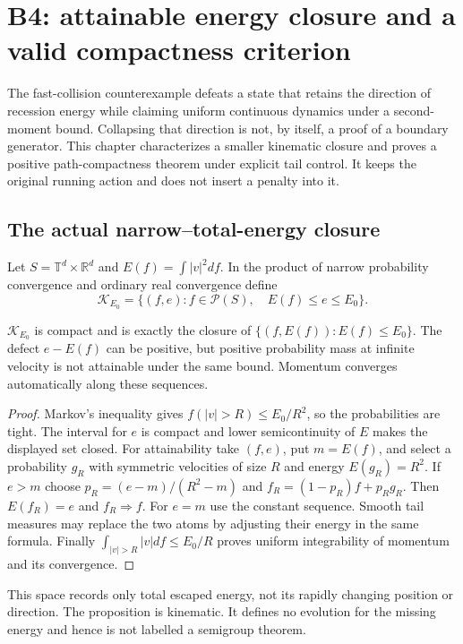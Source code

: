 \section{B4: attainable energy closure and a valid compactness criterion}
\label{sec:r33-b4}

The fast-collision counterexample defeats a state that retains the direction of recession energy while claiming uniform continuous dynamics under a second-moment bound. Collapsing that direction is not, by itself, a proof of a boundary generator. This chapter characterizes a smaller kinematic closure and proves a positive path-compactness theorem under explicit tail control. It keeps the original running action and does not insert a penalty into it.

\subsection{The actual narrow--total-energy closure}
Let $S=\mathbb T^d\times\mathbb R^d$ and $E(f)=\int|v|^2df$. In the product of narrow probability convergence and ordinary real convergence define
\[
 \mathcal K_{E_0}=\{(f,e): f\in\mathcal P(S),\quad E(f)\le e\le E_0\}.
\]

\begin{proposition}
\label{prop:r33-b4-closure}
$\mathcal K_{E_0}$ is compact and is exactly the closure of
$\{(f,E(f)):E(f)\le E_0\}$. The defect $e-E(f)$ can be positive, but positive probability mass at infinite velocity is not attainable under the same bound. Momentum converges automatically along these sequences.
\end{proposition}

\begin{proof}
Markov's inequality gives $f(|v|>R)\le E_0/R^2$, so the probabilities are tight. The interval for $e$ is compact and lower semicontinuity of $E$ makes the displayed set closed. For attainability take $(f,e)$, put $m=E(f)$, and select a probability $g_R$ with symmetric velocities of size $R$ and energy $E(g_R)=R^2$. If $e>m$ choose $p_R=(e-m)/(R^2-m)$ and $f_R=(1-p_R)f+p_Rg_R$. Then $E(f_R)=e$ and $f_R\Rightarrow f$. For $e=m$ use the constant sequence. Smooth tail measures may replace the two atoms by adjusting their energy in the same formula. Finally $\int_{|v|>R}|v|df\le E_0/R$ proves uniform integrability of momentum and its convergence.
\end{proof}

This space records only total escaped energy, not its rapidly changing position or direction. The proposition is kinematic. It defines no evolution for the missing energy and hence is not labelled a semigroup theorem.

